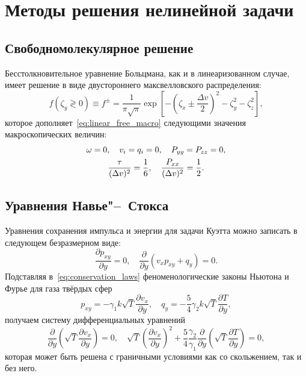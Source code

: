 \documentclass[a4paper,12pt]{article}
\newcommand{\pder}[2][]{\frac{\partial#1}{\partial#2}}
\begin{document}
\section{Методы решения нелинейной задачи}

\subsection{Свободномолекулярное решение}

Бесстолкновительное уравнение Больцмана, как и в линеаризованном случае, имеет решение
в виде двустороннего максвелловского распределения:
\begin{equation}\label{eq:free_solution}
    f(\zeta_y \gtrless 0) \equiv f^\pm =
    	\frac1{\pi\sqrt\pi} \exp\left[-\left(\zeta_x\pm\frac{\Delta{v}}2\right)^2 - \zeta_y^2 - \zeta_z^2\right],
\end{equation}
которое дополняет~\eqref{eq:linear_free_macro} следующими значения макроскопических величин:
\begin{gather}\label{eq:free_macro}
    \omega = 0, \quad v_i = q_i = 0, \quad P_{yy} = P_{zz} = 0, \notag \\
    \frac{\tau}{(\Delta{v})^2} = \frac16, \quad \frac{P_{xx}}{(\Delta{v})^2} = \frac12.
\end{gather}

\subsection{Уравнения Навье"--~Стокса}\label{sec:Navier-Stokes}

Уравнения сохранения импульса и энергии для задачи Куэтта можно записать в следующем
безразмерном виде:
\begin{equation}\label{eq:conservation_laws}
    \pder[p_{xy}]{y} = 0, \quad \pder{y}(v_x p_{xy} + q_y) = 0.
\end{equation}
Подставляя в~\eqref{eq:conservation_laws} феноменологические законы Ньютона и Фурье для газа твёрдых сфер
\begin{equation}\label{eq:Newton-Fourier}
    p_{xy} = -\gamma_1 k\sqrt{T}\pder[v_x]{y}, \quad q_y = -\frac54\gamma_2 k\sqrt{T}\pder[T]{y},
\end{equation}
получаем систему дифференциальных уравнений
\begin{equation}\label{eq:Navier-Stokes}
    \pder{y}\left(\sqrt{T}\pder[v_x]{y}\right) = 0, \quad
    \sqrt{T}\left(\pder[v_x]{y}\right)^2 + \frac54\frac{\gamma_2}{\gamma_1}\pder{y}\left(\sqrt{T}\pder[T]{y}\right) = 0,
\end{equation}
которая может быть решена с граничными условиями как со скольжением, так и без него.
\end{document}
